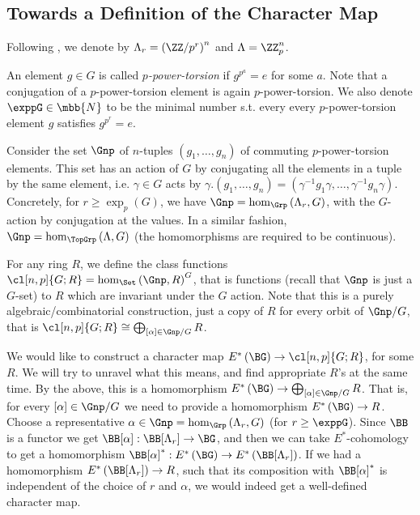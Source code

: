


\subsection{Towards a Definition of the Character Map}

Following \cite{HKR}, we denote by $\Lambda_r = \left(\ZZ/{p^r}\right)^n$ and $\Lambda = \ZZ_p^n$.

An element $g \in G$ is called \emph{$p$-power-torsion} if $g^{p^a} = e$ for some $a$.
Note that a conjugation of a $p$-power-torsion element is again $p$-power-torsion.
We also denote $\exppG \in \mbb{N}$ to be the minimal number s.t. every every $p$-power-torsion element $g$ satisfies $g^{p^r} = e$.

Consider the set $\Gnp$ of $n$-tuples $\left(g_1, \dotsc, g_n\right)$ of commuting $p$-power-torsion elements.
This set has an action of $G$ by conjugating all the elements in a tuple by the same element, i.e. $\gamma \in G$ acts by $\gamma. \left(g_1, \dotsc, g_n\right) = \left(\gamma^{-1} g_1 \gamma, \dotsc, \gamma^{-1} g_n \gamma\right)$.
Concretely, for $r \geq \exp_p\left(G\right)$, we have $\Gnp = \hom_{\Grp}\left(\Lambda_r, G\right)$, with the $G$-action by conjugation at the values.
In a similar fashion, $\Gnp = \hom_{\TopGrp}\left(\Lambda, G\right)$ (the homomorphisms are required to be continuous).

For any ring $R$, we define the class functions $\cl[n,p]{G; R} = \hom_{\Set}\left(\Gnp, R\right)^G$, that is functions (recall that $\Gnp$ is just a $G$-set) to $R$ which are invariant under the $G$ action.
Note that this is a purely algebraic/combinatorial construction, just a copy of $R$ for every orbit of $\Gnp/G$, that is $\cl[n,p]{G; R} \cong \bigoplus_{\left[\alpha\right] \in \Gnp/G} R$.

We would like to construct a character map $E^*\left(\BG\right) \to \cl[n,p]{G; R}$, for some $R$.
We will try to unravel what this means, and find appropriate $R$'s at the same time.
By the above, this is a homomorphism $E^*\left(\BG\right) \to \bigoplus_{\left[\alpha\right] \in \Gnp/G} R$.
That is, for every $\left[\alpha\right] \in \Gnp/G$ we need to provide a homomorphism $E^*\left(\BG\right) \to R$.
Choose a representative $\alpha \in \Gnp = \hom_{\Grp}\left(\Lambda_r, G\right)$ (for $r \geq \exppG$).
Since $\BB$ is a functor we get $\BB[\alpha]: \BB[\Lambda_r] \to \BG$, and then we can take $E^*$-cohomology to get a homomorphism $\BB[\alpha]^*: E^*\left(\BG\right) \to E^*\left(\BB[\Lambda_r]\right)$.
If we had a homomorphism $E^*\left(\BB[\Lambda_r]\right) \to R$, such that its composition with $\BB[\alpha]^*$ is independent of the choice of $r$ and $\alpha$, we would indeed get a well-defined character map.



